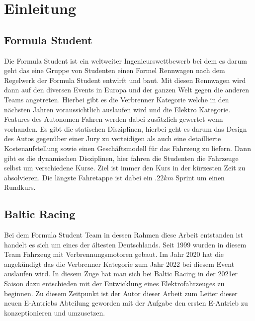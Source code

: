 


\chapter{Einleitung}

\section{Formula Student}
Die Formula Student ist ein weltweiter Ingenieurswettbewerb bei dem es darum geht das eine Gruppe von Studenten einen Formel Rennwagen nach dem Regelwerk der Formula Student entwirft und baut. Mit diesen Rennwagen wird dann auf den diversen Events in Europa und der ganzen Welt gegen die anderen Teams angetreten. Hierbei gibt es die Verbrenner Kategorie welche in den nächsten Jahren voraussichtlich auslaufen wird und die Elektro Kategorie. Features des Autonomen Fahren werden dabei zusätzlich gewertet wenn vorhanden. Es gibt die statischen Disziplinen, hierbei geht es darum das Design des Autos gegenüber einer Jury zu verteidigen als auch eine detaillierte Kostenaufstellung sowie einen Geschäftsmodell für das Fahrzeug zu liefern. Dann gibt es die dynamischen Disziplinen, hier fahren die Studenten die Fahrzeuge selbst um verschiedene Kurse. Ziel ist immer den Kurs in der kürzesten Zeit zu absolvieren. Die längste Fahretappe ist dabei ein .\ensuremath{22 km} Sprint um einen Rundkurs.

\section{Baltic Racing}
Bei dem Formula Student Team in dessen Rahmen diese Arbeit entstanden ist handelt es sich um eines der ältesten Deutschlands. Seit 1999 wurden in diesem Team Fahrzeug mit Verbrennungsmotoren gebaut. Im Jahr 2020 hat die  angekündigt das die Verbrenner Kategorie zum Jahr 2022 bei diesem Event auslaufen wird. In diesem Zuge hat man sich bei Baltic Racing in der 2021er Saison dazu entschieden mit der Entwicklung eines Elektrofahrzeuges zu beginnen. Zu diesem Zeitpunkt ist der Autor dieser Arbeit zum Leiter dieser neuen E-Antriebs Abteilung geworden mit der Aufgabe den ersten E-Antrieb zu konzeptionieren und umzusetzen.

